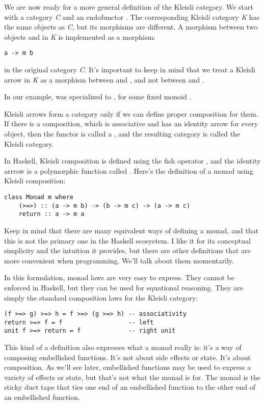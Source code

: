 We are now ready for a more general definition of the Kleisli category.
We start with a category \emph{C} and an endofunctor . The
corresponding Kleisli category \emph{K} has the same objects as
\emph{C}, but its morphisms are different. A morphism between two
objects  and  in \emph{K} is implemented as a
morphism:

\begin{Verbatim}[commandchars=\\\{\}]
a -> m b
\end{Verbatim}
in the original category \emph{C}. It's important to keep in mind that
we treat a Kleisli arrow in \emph{K} as a morphism between 
and , and not between  and .

In our example,  was specialized to , for
some fixed monoid .

Kleisli arrows form a category only if we can define proper composition
for them. If there is a composition, which is associative and has an
identity arrow for every object, then the functor  is called a
, and the resulting category is called the Kleisli category.

In Haskell, Kleisli composition is defined using the fish operator
\code{>=>}, and the identity arrrow is a
polymorphic function called . Here's the definition of a
monad using Kleisli composition:

\begin{Verbatim}[commandchars=\\\{\}]
class Monad m where 
    (>=>) :: (a -> m b) -> (b -> m c) -> (a -> m c)
    return :: a -> m a
\end{Verbatim}
Keep in mind that there are many equivalent ways of defining a monad,
and that this is not the primary one in the Haskell ecosystem. I like it
for its conceptual simplicity and the intuition it provides, but there
are other definitions that are more convenient when programming. We'll
talk about them momentarily.

In this formulation, monad laws are very easy to express. They cannot be
enforced in Haskell, but they can be used for equational reasoning. They
are simply the standard composition laws for the Kleisli category:

\begin{Verbatim}[commandchars=\\\{\}]
(f >=> g) >=> h = f >=> (g >=> h) -- associativity
return >=> f = f                  -- left
unit f >=> return = f             -- right unit
\end{Verbatim}
This kind of a definition also expresses what a monad really is: it's a
way of composing embellished functions. It's not about side effects or
state. It's about composition. As we'll see later, embellished functions
may be used to express a variety of effects or state, but that's not
what the monad is for. The monad is the sticky duct tape that ties one
end of an embellished function to the other end of an embellished
function.

